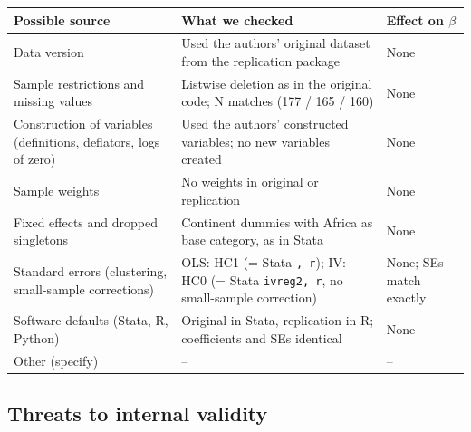 \documentclass[11pt,a4paper]{article}
\renewcommand{\arraystretch}{1.25}
\begin{document}
{\renewcommand{\arraystretch}{1.4}%
\begin{tabularx}{\textwidth}{@{}>{\raggedright\arraybackslash}p{}L>{\raggedright\arraybackslash}p{0.15\textwidth}@{}}
\toprule
Possible source & What we checked & Effect on $\beta$ \\
\midrule
Data version & Used the authors' original dataset from the replication package & None \\
Sample restrictions and missing values & Listwise deletion as in the original code; N matches (177 / 165 / 160) & None \\
Construction of variables (definitions, deflators, logs of zero) & Used the authors' constructed variables; no new variables created & None \\
Sample weights & No weights in original or replication & None \\
Fixed effects and dropped singletons & Continent dummies with Africa as base category, as in Stata & None \\
Standard errors (clustering, small-sample corrections) & OLS: HC1 (= Stata \texttt{, r}); IV: HC0 (= Stata \texttt{ivreg2, r}, no small-sample correction) & None; SEs match exactly \\
Software defaults (Stata, R, Python) & Original in Stata, replication in R; coefficients and SEs identical & None \\
Other (specify) & -- & -- \\
\bottomrule
\end{tabularx}}

\subsection{Threats to internal validity}
\end{document}
